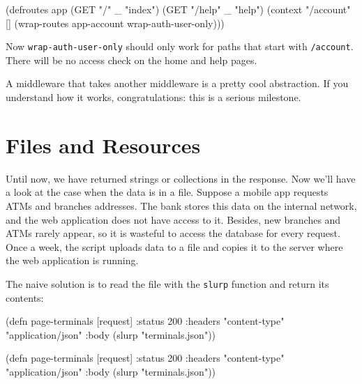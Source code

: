 \else

\begin{english}
  \begin{clojure}
(defroutes app
  (GET "/"     _ "index")
  (GET "/help" _ "help")
  (context "/account" []
    (wrap-routes app-account wrap-auth-user-only)))
  \end{clojure}
\end{english}

\fi


Now \verb|wrap-auth-user-only| should only work for paths that start with \verb|/account|. There will be no access check on the home and help pages.

A middleware that takes another middleware is a pretty cool abstraction. If you understand how it works, congratulations: this is a serious milestone.

\section{Files and Resources}

\label{http-files}

Until now, we have returned strings or collections in the response. Now we'll have a look at the case when the data is in a file. Suppose a mobile app requests ATMs and branches addresses. The bank stores this data on the internal network, and the web application does not have access to it. Besides, new branches and ATMs rarely appear, so it is wasteful to access the database for every request. Once a week, the script uploads data to a file and copies it to the server where
the web application is running.


The naive solution is to read the file with the \verb|slurp| function and return its contents:

\ifx\DEVICETYPE\MOBILE

\begin{english}
  \begin{clojure}
(defn page-terminals [request]
  {:status 200
   :headers
   {"content-type" "application/json"}
   :body (slurp "terminals.json")})
  \end{clojure}
\end{english}

\else

\begin{english}
  \begin{clojure}
(defn page-terminals [request]
  {:status 200
   :headers {"content-type" "application/json"}
   :body (slurp "terminals.json")})
  \end{clojure}
\end{english}

